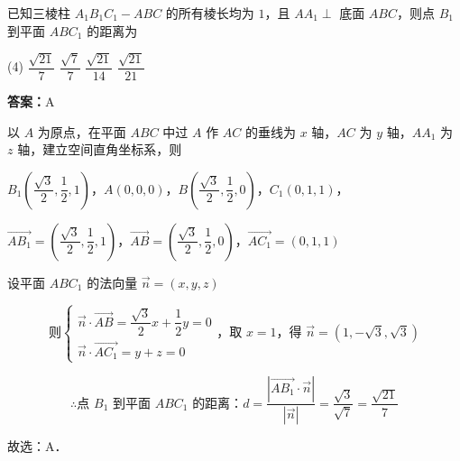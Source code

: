 \begin{example}[\bkstar{3}{5}]
已知三棱柱 $A_1B_1C_1-ABC$ 的所有棱长均为 $1$，且 $AA_1\perp$ 底面 $ABC$，则点 $B_1$ 到平面 $ABC_1$ 的距离为
\begin{tasks}(4)
    \task $\dfrac{\sqrt{21}}{7}$
    \task $\dfrac{\sqrt{7}}{7}$
    \task $\dfrac{\sqrt{21}}{14}$
    \task $\dfrac{\sqrt{21}}{21}$
\end{tasks}
\end{example}
\begin{solution}
\textbf{答案：}A

以 $A$ 为原点，在平面 $ABC$ 中过 $A$ 作 $AC$ 的垂线为 $x$ 轴，$AC$ 为 $y$ 轴，$AA_1$ 为 $z$ 轴，建立空间直角坐标系，则

$B_1\left(\dfrac{\sqrt{3}}{2},\dfrac{1}{2},1\right)$，$A(0,0,0)$，$B\left(\dfrac{\sqrt{3}}{2},\dfrac{1}{2},0\right)$，$C_1(0,1,1)$，

$\overrightarrow{AB_1}=\left(\dfrac{\sqrt{3}}{2},\dfrac{1}{2},1\right)$，$\overrightarrow{AB}=\left(\dfrac{\sqrt{3}}{2},\dfrac{1}{2},0\right)$，$\overrightarrow{AC_1}=(0,1,1)$

设平面 $ABC_1$ 的法向量 $\overrightarrow{n}=(x,y,z)$

$$
\text{则}\left\{\begin{array}{l}
\overrightarrow{n}\cdot\overrightarrow{AB}=\dfrac{\sqrt{3}}{2}x+\dfrac{1}{2}y=0\\
\overrightarrow{n}\cdot\overrightarrow{AC_1}=y+z=0
\end{array}\right.\text{，取 }x=1\text{，得 }\overrightarrow{n}=\left(1,-\sqrt{3},\sqrt{3}\right)
$$

$$
\therefore\text{点 }B_1\text{ 到平面 }ABC_1\text{ 的距离：}d=\dfrac{\left|\overrightarrow{AB_1}\cdot\overrightarrow{n}\right|}{\left|\overrightarrow{n}\right|}=\dfrac{\sqrt{3}}{\sqrt{7}}=\dfrac{\sqrt{21}}{7}
$$

故选：A．
\end{solution}

\vspace{2em}


